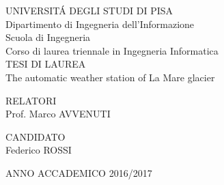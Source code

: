 \begin{titlepage}
    \begin{center}
      UNIVERSIT\'{A} DEGLI STUDI DI PISA\\
      Dipartimento di Ingegneria dell'Informazione\\
      Scuola di Ingegneria\\
      Corso di laurea triennale in Ingegneria Informatica\\
      \vspace*{5\baselineskip}
      TESI DI LAUREA\\
      The automatic weather station of La Mare glacier
      \vspace*{10\baselineskip}      
    \end{center}
    
    \begin{flushleft}
      RELATORI\\
      Prof. Marco AVVENUTI\\
    \end{flushleft}
    
    \begin{flushright}
      CANDIDATO\\
      Federico ROSSI
    \end{flushright}
    \vspace{\fill}
    \begin{center}
        ANNO ACCADEMICO 2016/2017
    \end{center}
\end{titlepage}